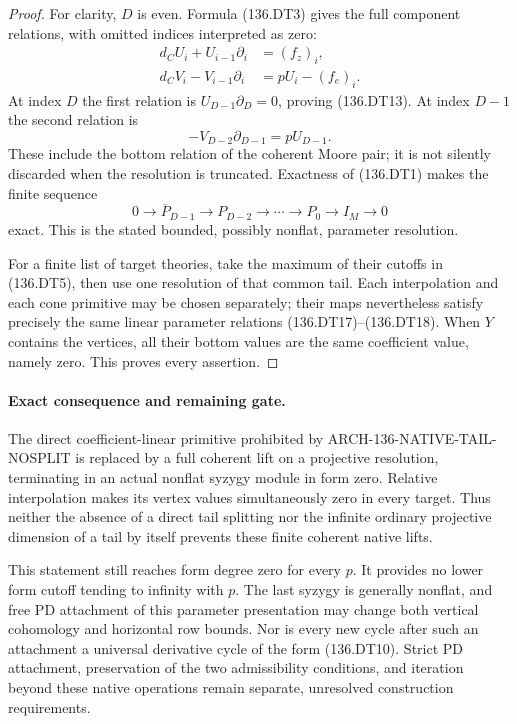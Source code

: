 \begin{proof}
For clarity, \(D\) is even. Formula (136.DT3) gives the full
component relations, with omitted indices interpreted as zero:
\[
 \begin{split}
 d_C U_i+U_{i-1}\partial_i&=(f_z)_i,\\
 d_C V_i-V_{i-1}\partial_i&=pU_i-(f_e)_i.
 \end{split}                                           \tag{136.DT17}
\]
At index \(D\) the first relation is
\(U_{D-1}\partial_D=0\), proving (136.DT13).
At index \(D-1\) the second relation is
\[
                -V_{D-2}\partial_{D-1}=pU_{D-1}.
                                                        \tag{136.DT18}
\]
These include the bottom relation of the coherent Moore pair;
it is not silently discarded when the resolution is truncated.
Exactness of (136.DT1) makes the finite sequence
\[
 0\longrightarrow\overline P_{D-1}\longrightarrow P_{D-2}
       \longrightarrow\cdots\longrightarrow P_0
       \longrightarrow I_M\longrightarrow0
                                                        \tag{136.DT19}
\]
exact. This is the stated bounded, possibly nonflat, parameter
resolution.

For a finite list of target theories, take the maximum of their
cutoffs in (136.DT5), then use one resolution of that common tail.
Each interpolation and each cone primitive may be chosen separately;
their maps nevertheless satisfy precisely the same linear parameter
relations (136.DT17)--(136.DT18). When \(Y\) contains the vertices,
all their bottom values are the same coefficient value, namely zero.
This proves every assertion.
\end{proof}

\paragraph{Exact consequence and remaining gate.}
The direct coefficient-linear primitive prohibited by
ARCH-136-NATIVE-TAIL-NOSPLIT is replaced by a full coherent lift
on a projective resolution, terminating in an actual nonflat
syzygy module in form zero. Relative interpolation makes its
vertex values simultaneously zero in every target. Thus neither
the absence of a direct tail splitting nor the infinite ordinary
projective dimension of a tail by itself prevents these finite
coherent native lifts.

This statement still reaches form degree zero for every \(p\).
It provides no lower form cutoff tending to infinity with \(p\).
The last syzygy is generally nonflat, and free PD attachment of
this parameter presentation may change both vertical cohomology
and horizontal row bounds. Nor is every new cycle after such an
attachment a universal derivative cycle of the form (136.DT10).
Strict PD attachment, preservation of the two admissibility
conditions, and iteration beyond these native operations remain
separate, unresolved construction requirements.
